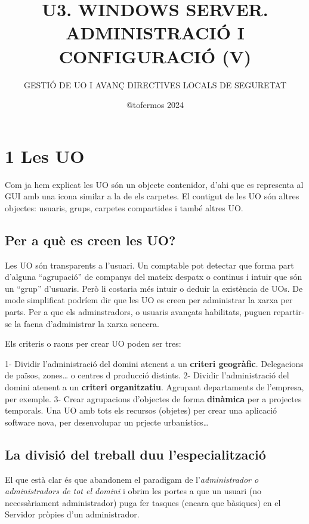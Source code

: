 \documentclass[
  a4paper,
]{article}
\title{U3. WINDOWS SERVER. ADMINISTRACIÓ I CONFIGURACIÓ (V)}
\subtitle{GESTIÓ DE UO I AVANÇ DIRECTIVES LOCALS DE SEGURETAT}
\author{@tofermos 2024}
\date{}
\begin{document}
\maketitle

{
\setcounter{tocdepth}{2}
\tableofcontents
}
\newpage
\renewcommand\tablename{Tabla}

\section{1 Les UO}\label{les-uo}

Com ja hem explicat les UO són un objecte contenidor, d'ahi que es
representa al GUI amb una icona similar a la de els carpetes. El
contigut de les UO són altres objectes: usuaris, grups, carpetes
compartides i també altres UO.

\subsection{Per a què es creen les
UO?}\label{per-a-quuxe8-es-creen-les-uo}

Les UO són transparents a l'usuari. Un comptable pot detectar que forma
part d'alguna ``agrupació'' de companys del mateix despatx o continus i
intuir que són un ``grup'' d'usuaris. Però li costaria més intuir o
deduir la existència de UOs. De mode simplificat podríem dir que les UO
es creen per administrar la xarxa per parts. Per a que els
adminstradors, o usuaris avançats habilitats, puguen repartir-se la
faena d'administrar la xarxa sencera.

Els criteris o raons per crear UO poden ser tres:

1- Dividir l'administració del domini atenent a un \textbf{criteri
geogràfic}. Delegacions de països, zones\ldots{} o centres d producció
distints. 2- Dividir l'administració del domini atenent a un
\textbf{criteri organitzatiu}. Agrupant departaments de l'empresa, per
exemple. 3- Crear agrupacions d'objectes de forma \textbf{dinàmica} per
a projectes temporals. Una UO amb tots els recursos (objetes) per crear
una aplicació software nova, per desenvolupar un prjecte
urbanístics\ldots{}

\subsection{La divisió del treball duu
l'especialització}\label{la-divisiuxf3-del-treball-duu-lespecialitzaciuxf3}

El que està clar és que abandonem el paradigam de l'\emph{administrador
o administradors de tot el domini} i obrim les portes a que un usuari
(no necessàriament administrador) puga fer tasques (encara que bàsiques)
en el Servidor pròpies d'un administrador.
\end{document}
